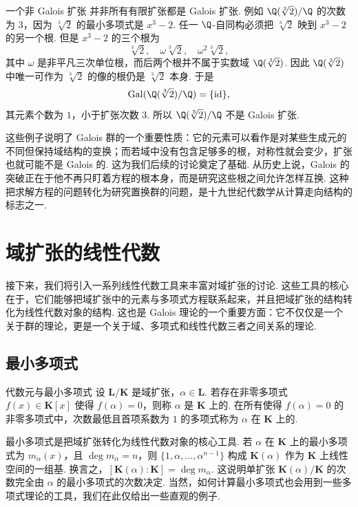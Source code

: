 \begin{example}{一个非 Galois 扩张}{}
    并非所有有限扩张都是 Galois 扩张. 例如 $\Q(\sqrt[3]{2})/\Q$ 的次数为 $3$，因为 $\sqrt[3]{2}$ 的最小多项式是 $x^3-2$. 任一 $\Q$-自同构必须把 $\sqrt[3]{2}$ 映到 $x^3-2$ 的另一个根. 但是 $x^3-2$ 的三个根为
    \[
        \sqrt[3]{2},\quad \omega\sqrt[3]{2},\quad \omega^2\sqrt[3]{2},
    \]
    其中 $\omega$ 是非平凡三次单位根，而后两个根并不属于实数域 $\Q(\sqrt[3]{2})$. 因此 $\Q(\sqrt[3]{2})$ 中唯一可作为 $\sqrt[3]{2}$ 的像的根仍是 $\sqrt[3]{2}$ 本身. 于是
    \[
        \Gal(\Q(\sqrt[3]{2})/\Q)=\{\operatorname{id}\},
    \]
    其元素个数为 $1$，小于扩张次数 $3$. 所以 $\Q(\sqrt[3]{2})/\Q$ 不是 Galois 扩张.
\end{example}

这些例子说明了 Galois 群的一个重要性质：它的元素可以看作是对某些生成元的不同但保持域结构的变换；而若域中没有包含足够多的根，对称性就会变少，扩张也就可能不是 Galois 的. 这为我们后续的讨论奠定了基础. 从历史上说，Galois 的突破正在于他不再只盯着方程的根本身，而是研究这些根之间允许怎样互换. 这种把求解方程的问题转化为研究置换群的问题，是十九世纪代数学从计算走向结构的标志之一.

\section{域扩张的线性代数}

接下来，我们将引入一系列线性代数工具来丰富对域扩张的讨论. 这些工具的核心在于，它们能够把域扩张中的元素与多项式方程联系起来，并且把域扩张的结构转化为线性代数对象的结构. 这也是 Galois 理论的一个重要方面：它不仅仅是一个关于群的理论，更是一个关于域、多项式和线性代数三者之间关系的理论.

\subsection{最小多项式}

\begin{definition}{代数元与最小多项式}{}
    设 $\mathbf{L}/\mathbf{K}$ 是域扩张，$\alpha\in\mathbf{L}$. 若存在非零多项式 $f(x)\in\mathbf{K}[x]$ 使得 $f(\alpha)=0$，则称 $\alpha$ 是 $\mathbf{K}$ 上的. 在所有使得 $f(\alpha)=0$ 的非零多项式中，次数最低且首项系数为 $1$ 的多项式称为 $\alpha$ 在 $\mathbf{K}$ 上的.
\end{definition}

最小多项式是把域扩张转化为线性代数对象的核心工具. 若 $\alpha$ 在 $\mathbf{K}$ 上的最小多项式为 $m_\alpha(x)$，且 $\deg m_\alpha=n$，则 $\{1,\alpha,\ldots,\alpha^{n-1}\}$ 构成 $\mathbf{K}(\alpha)$ 作为 $\mathbf{K}$ 上线性空间的一组基. 换言之，$[\mathbf{K}(\alpha):\mathbf{K}]=\deg m_\alpha$. 这说明单扩张 $\mathbf{K}(\alpha)/\mathbf{K}$ 的次数完全由 $\alpha$ 的最小多项式的次数决定. 当然，如何计算最小多项式也会用到一些多项式理论的工具，我们在此仅给出一些直观的例子.

